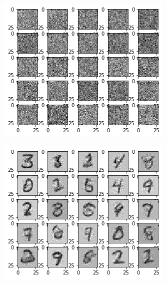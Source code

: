 \begin{figure}[htbp!]
     \centering
     \begin{subfigure}[b]{0.3\textwidth}
         \centering
         \includegraphics[width=\textwidth]{Images/prior1.png}
         \label{fig:nice_results_sampled}
     \end{subfigure} 
     \hfill
     \begin{subfigure}[b]{0.3\textwidth}
         \centering
         \includegraphics[width=\textwidth]{Images/mnist1.png}

\end{subfigure}
\end{figure}
